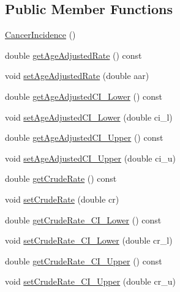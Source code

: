 \subsection*{Public Member Functions}
\begin{DoxyCompactItemize}
\item 
\hyperlink{classbridges_1_1dataset_1_1_cancer_incidence_a2a6314af5704aa8f9f962738e12cd9dc}{Cancer\+Incidence} ()
\item 
double \hyperlink{classbridges_1_1dataset_1_1_cancer_incidence_abb8b465d513b8e7113c0dda4f1381b36}{get\+Age\+Adjusted\+Rate} () const
\item 
void \hyperlink{classbridges_1_1dataset_1_1_cancer_incidence_a435d5bd5a9c8680c3e2c94c8b7fad79f}{set\+Age\+Adjusted\+Rate} (double aar)
\item 
double \hyperlink{classbridges_1_1dataset_1_1_cancer_incidence_aacd1d64c111c166bfdfc022c03276d16}{get\+Age\+Adjusted\+C\+I\+\_\+\+Lower} () const
\item 
void \hyperlink{classbridges_1_1dataset_1_1_cancer_incidence_ac747ae48aa5619cb41d8296420eb3925}{set\+Age\+Adjusted\+C\+I\+\_\+\+Lower} (double ci\+\_\+l)
\item 
double \hyperlink{classbridges_1_1dataset_1_1_cancer_incidence_aa4c0975807e67227388f23fbf92e0867}{get\+Age\+Adjusted\+C\+I\+\_\+\+Upper} () const
\item 
void \hyperlink{classbridges_1_1dataset_1_1_cancer_incidence_a7cece904f540224984518679bc4ae544}{set\+Age\+Adjusted\+C\+I\+\_\+\+Upper} (double ci\+\_\+u)
\item 
double \hyperlink{classbridges_1_1dataset_1_1_cancer_incidence_aee79da5ad2ce63e44f4400276cc78f63}{get\+Crude\+Rate} () const
\item 
void \hyperlink{classbridges_1_1dataset_1_1_cancer_incidence_ad9bcbee58cbcb2b23d50f78e034faeb3}{set\+Crude\+Rate} (double cr)
\item 
double \hyperlink{classbridges_1_1dataset_1_1_cancer_incidence_a66d6a4f6a977c04480610d7fc7c7093b}{get\+Crude\+Rate\+\_\+\+C\+I\+\_\+\+Lower} () const
\item 
void \hyperlink{classbridges_1_1dataset_1_1_cancer_incidence_af75985ca4df5b0138312128580281cd8}{set\+Crude\+Rate\+\_\+\+C\+I\+\_\+\+Lower} (double cr\+\_\+l)
\item 
double \hyperlink{classbridges_1_1dataset_1_1_cancer_incidence_a173b07266305744cac5f853cac7a089e}{get\+Crude\+Rate\+\_\+\+C\+I\+\_\+\+Upper} () const
\item 
void \hyperlink{classbridges_1_1dataset_1_1_cancer_incidence_a9fa8b9c9fc4874e45d21612c817ed394}{set\+Crude\+Rate\+\_\+\+C\+I\+\_\+\+Upper} (double cr\+\_\+u)

\end{DoxyCompactItemize}
